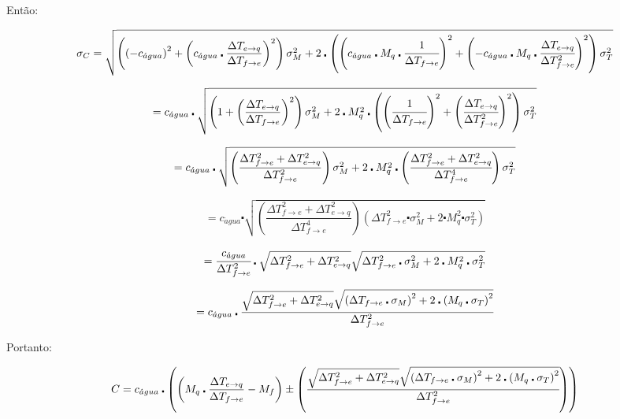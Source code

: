 \documentclass[a4paper]{article}
\begin{document}
			Então:

			\[
				\sigma_{C}=\sqrt{\left(\left(-c_{\acute{a}gua}\right)^{2}+\left(c_{\acute{a}gua}\centerdot\dfrac{\Delta T_{e\rightarrow q}}{\Delta T_{f\rightarrow e}}\right)^{2}\right)\sigma_{M}^{2}+2\centerdot\left(\left(c_{\acute{a}gua}\centerdot M_{q}\centerdot\cfrac{1}{\Delta T_{f\rightarrow e}}\right)^{2}+\left(-c_{\acute{a}gua}\centerdot M_{q}\centerdot\cfrac{\Delta T_{e\rightarrow q}}{\Delta T_{f\rightarrow e}^{2}}\right)^{2}\right)\sigma_{T}^{2}}
			\]


			\[
				=c_{\acute{a}gua}\centerdot\sqrt{\left(1+\left(\dfrac{\Delta T_{e\rightarrow q}}{\Delta T_{f\rightarrow e}}\right)^{2}\right)\sigma_{M}^{2}+2\centerdot M_{q}^{2}\centerdot\left(\left(\cfrac{1}{\Delta T_{f\rightarrow e}}\right)^{2}+\left(\cfrac{\Delta T_{e\rightarrow q}}{\Delta T_{f\rightarrow e}^{2}}\right)^{2}\right)\sigma_{T}^{2}}
			\]


			\[
				=c_{\acute{a}gua}\centerdot\sqrt{\left(\dfrac{\Delta T_{f\rightarrow e}^{2}+\Delta T_{e\rightarrow q}^{2}}{\Delta T_{f\rightarrow e}^{2}}\right)\sigma_{M}^{2}+2\centerdot M_{q}^{2}\centerdot\left(\cfrac{\Delta T_{f\rightarrow e}^{2}+\Delta T_{e\rightarrow q}^{2}}{\Delta T_{f\rightarrow e}^{4}}\right)\sigma_{T}^{2}}
			\]


			\[
				=c_{\acute{a}gua}\centerdot\sqrt{\left(\dfrac{\Delta T_{f\rightarrow e}^{2}+\Delta T_{e\rightarrow q}^{2}}{\Delta T_{f\rightarrow e}^{4}}\right)\left(\Delta T_{f\rightarrow e}^{2}\centerdot\sigma_{M}^{2}+2\centerdot M_{q}^{2}\centerdot\sigma_{T}^{2}\right)}
			\]


			\[
				=\cfrac{c_{\acute{a}gua}}{\Delta T_{f\rightarrow e}^{2}}\centerdot\sqrt{\Delta T_{f\rightarrow e}^{2}+\Delta T_{e\rightarrow q}^{2}}\sqrt{\Delta T_{f\rightarrow e}^{2}\centerdot\sigma_{M}^{2}+2\centerdot M_{q}^{2}\centerdot\sigma_{T}^{2}}
			\]


			\[
				=c_{\acute{a}gua}\centerdot\cfrac{\sqrt{\Delta T_{f\rightarrow e}^{2}+\Delta T_{e\rightarrow q}^{2}}\sqrt{\left(\Delta T_{f\rightarrow e}\centerdot\sigma_{M}\right)^{2}+2\centerdot\left(M_{q}\centerdot\sigma_{T}\right)^{2}}}{\Delta T_{f\rightarrow e}^{2}}
			\]


			Portanto:

			\[
			C=c_{\acute{a}gua}\centerdot\left(\left(M_{q}\centerdot\dfrac{\Delta T_{e\rightarrow q}}{\Delta T_{f\rightarrow e}}-M_{f}\right)\pm\left(\cfrac{\sqrt{\Delta T_{f\rightarrow e}^{2}+\Delta T_{e\rightarrow q}^{2}}\sqrt{\left(\Delta T_{f\rightarrow e}\centerdot\sigma_{M}\right)^{2}+2\centerdot\left(M_{q}\centerdot\sigma_{T}\right)^{2}}}{\Delta T_{f\rightarrow e}^{2}}\right)\right)
			\]
\end{document}
